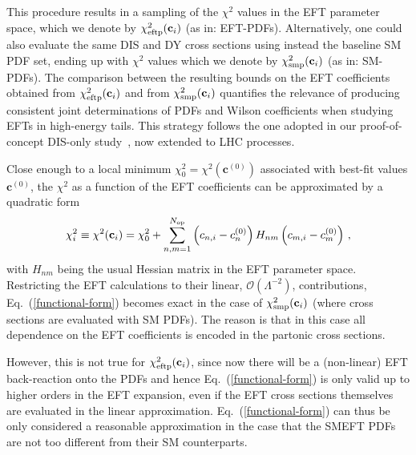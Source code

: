 \documentclass[withindex,glossary]{cam-thesis}
\begin{document}
This procedure results in a sampling of the $\chi^2$ values
in the EFT parameter space, which we denote by $\chi_{\rm eftp}^2({\mathbf{c}_i})$
(as in: EFT-PDFs).
%
Alternatively, one could also evaluate the same DIS and DY cross sections using instead
the baseline SM PDF set, ending up with  $\chi^2$ values which we denote by $\chi_{\rm smp}^2({\mathbf{c}_i})$
(as in: SM-PDFs).
%
The comparison between the resulting bounds on the EFT coefficients
obtained  from 
$\chi_{\rm eftp}^2({\mathbf{c}_i})$
and from $\chi_{\rm smp}^2({\mathbf{c}_i})$ quantifies the relevance of
producing consistent joint determinations of PDFs and Wilson coefficients
when studying EFTs in high-energy tails.
%
This strategy follows the one adopted in our proof-of-concept DIS-only
study~\cite{Carrazza:2019sec}, now extended to LHC processes.

Close enough to a local minimum $\chi_0^2=\chi^2\left( \mathbf{c}^{(0)}\right)$ associated with best-fit values $\mathbf{c}^{(0)}$,
the $\chi^2$ as a function of the EFT coefficients can be approximated by a quadratic form
\begin{equation}
\label{functional-form}
\chi_i^2 \equiv \chi^2(\mathbf{c}_i) = \chi_0^2 +
\sum_{n,m=1}^{N_{\rm op}}\left( c_{n,i} - c^{(0)}_n\right)  H_{nm} 
    \left( c_{m,i} - c^{(0)}_m\right)\, ,
\end{equation}
with $H_{nm}$ being the usual Hessian matrix in the EFT parameter space.
%
Restricting the EFT calculations to their linear, $\mathcal{O}\left( \Lambda^{-2}\right)$, contributions, Eq.~(\ref{functional-form})
becomes exact
in the case of $\chi_{\rm smp}^2({\mathbf{c}_i})$ (where cross sections are
evaluated with SM PDFs).
%
The reason is that in this case
all dependence on the EFT coefficients is encoded in the partonic cross sections.

However, this is not true for $\chi_{\rm eftp}^2({\mathbf{c}_i})$, since now there will be a (non-linear) EFT back-reaction
onto the PDFs and hence Eq.~(\ref{functional-form}) is only valid up
to higher orders in the EFT expansion, even if the EFT cross sections themselves are evaluated in the linear
approximation.
%
Eq.~(\ref{functional-form}) can thus be only considered a reasonable approximation in the case that the SMEFT PDFs are not
too different from their SM counterparts.
\end{document}

